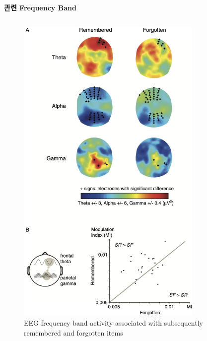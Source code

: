 \documentclass{beamer}
\begin{document}
\begin{frame}{\textbf{관련 Frequency Band}}
\begin{columns}
\begin{column}{0.38\textwidth}
\begin{figure}
        \includegraphics[width=0.8\textwidth]{image/remember_EEG}
        \caption{EEG frequency band activity associated with subsequently remembered and forgotten items}
      \end{figure}
    \end{column}
  \end{columns}
\end{frame}
\end{document}
